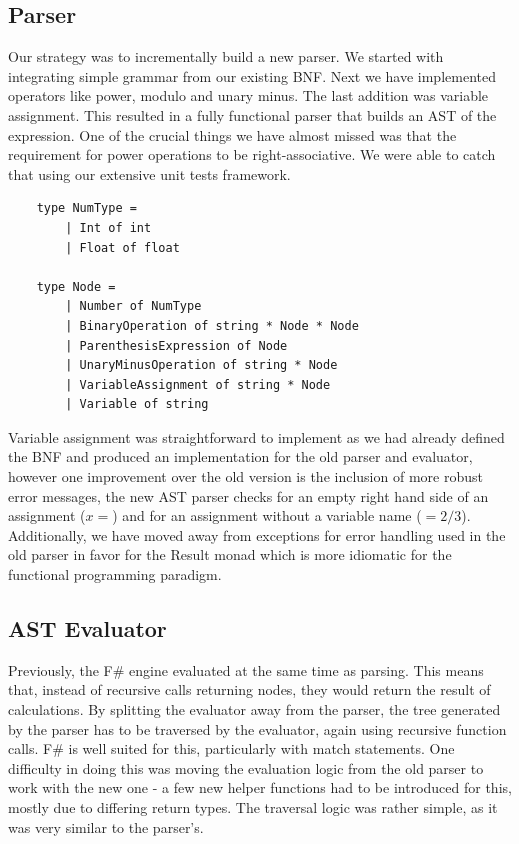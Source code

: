 \documentclass[a4paper, oneside, 11pt]{report}
\begin{document}
\subsection{Parser}
Our strategy was to incrementally build a new parser. We started with integrating simple grammar from our existing BNF. Next we have implemented operators like power, modulo and unary minus. The last addition was variable assignment. This resulted in a fully functional parser that builds an AST of the expression. One of the crucial things we have almost missed was that the requirement for power operations to be right-associative. We were able to catch that using our extensive unit tests framework.
\begin{verbatim}
    type NumType =
        | Int of int
        | Float of float

    type Node =
        | Number of NumType
        | BinaryOperation of string * Node * Node
        | ParenthesisExpression of Node
        | UnaryMinusOperation of string * Node
        | VariableAssignment of string * Node
        | Variable of string
\end{verbatim}
Variable assignment was straightforward to implement as we had already defined the BNF and produced an implementation for the old parser and evaluator, however one improvement over the old version is the inclusion of more robust error messages, the new AST parser checks for an empty right hand side of an assignment ($x = $) and for an assignment without a variable name ($= 2/3$). Additionally, we have moved away from exceptions for error handling used in the old parser in favor for the Result monad which is more idiomatic for the functional programming paradigm.

\subsection{AST Evaluator}
Previously, the F\# engine evaluated at the same time as parsing. This means that, instead of recursive calls returning nodes, they would return the result of calculations. By splitting the evaluator away from the parser, the tree generated by the parser has to be traversed by the evaluator, again using recursive function calls. F\# is well suited for this, particularly with match statements.
One difficulty in doing this was moving the evaluation logic from the old parser to work with the new one - a few new helper functions had to be introduced for this, mostly due to differing return types. The traversal logic was rather simple, as it was very similar to the parser's.
\end{document}
